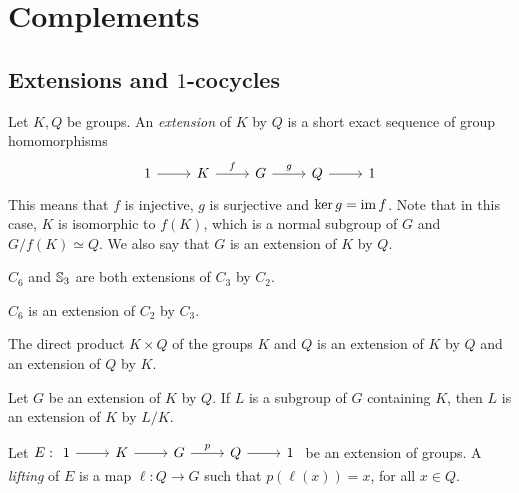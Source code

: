 \chapter{Complements}
\label{cocycles}

\section{Extensions and $1$-cocycles}


Let $K,Q$ be groups.
An {\em extension} of $K$ by $Q$ is a
short exact sequence of group homomorphisms 
\[
\begin{tikzcd}
	1 & K & G & Q & 1
	\arrow[from=1-1, to=1-2]
	\arrow["f", from=1-2, to=1-3]
	\arrow["g", from=1-3, to=1-4]
	\arrow[from=1-4, to=1-5]
\end{tikzcd}
\]
This means that $f$ is injective, $g$ is surjective and $\ker g=\operatorname{im} f$. Note that in this case, 
$K$ is isomorphic to $f(K)$, which is a normal subgroup of $G$ and $G/f(K)\simeq Q$. We also say that $G$ is an extension of $K$ by $Q$.

\begin{example}
	$C_6$ and $\mathbb{S}_3$ are both extensions of $C_3$ by $C_2$.
\end{example}

\begin{example}
	$C_6$ is an extension of $C_2$ by $C_3$.
\end{example}

\begin{example}
    The direct product $K\times Q$ of the groups $K$ and $Q$ 
    is an extension of $K$ by $Q$ and an extension of $Q$ by $K$. 
\end{example}

\begin{example}
Let $G$ be an extension of $K$ by $Q$. If $L$ is a subgroup of $G$ containing $K$, 
then $L$ is an extension
of $K$ by $L/K$.
\end{example}

Let $E:
\begin{tikzcd}
	1 & K & G & Q & 1
	\arrow[from=1-1, to=1-2]
	\arrow[from=1-2, to=1-3]
	\arrow["p", from=1-3, to=1-4]
	\arrow[from=1-4, to=1-5]
\end{tikzcd}$
be an extension of groups. A {\em lifting} of $E$ is a map $\ell\colon
Q\to G$ such that $p(\ell(x))=x$, for all $x\in Q$. 


